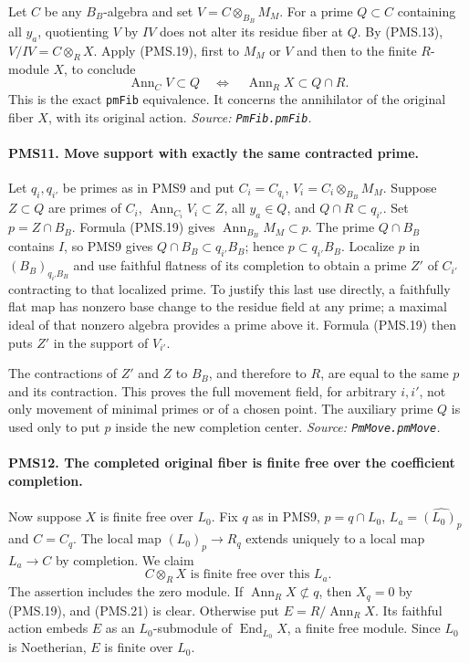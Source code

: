 Let $C$ be any $B_B$-algebra and set $V=C\otimes_{B_B}M_M$.
For a prime $Q\subset C$ containing all $y_a$, quotienting $V$
by $IV$ does not alter its residue fiber at $Q$.  By (PMS.13),
$V/IV=C\otimes_R X$.  Apply (PMS.19), first to $M_M$ or $V$
and then to the finite $R$-module $X$, to conclude
\[
 \operatorname{Ann}_{C}V\subset Q
 \quad\Longleftrightarrow\quad
 \operatorname{Ann}_{R}X\subset Q\cap R.          \tag{PMS.20}
\]
This is the exact \texttt{pmFib} equivalence.  It concerns the
annihilator of the original fiber $X$, with its original action.
\hfill\textit{Source: \texttt{PmFib.pmFib}.}

\paragraph{PMS11. Move support with exactly the same contracted prime.}
\label{claim:PMS11}
Let $q_i,q_{i'}$ be primes as in PMS9 and put
$C_i=C_{q_i}$, $V_i=C_i\otimes_{B_B}M_M$.
Suppose $Z\subset Q$ are primes of $C_i$,
$\operatorname{Ann}_{C_i}V_i\subset Z$, all $y_a\in Q$, and
$Q\cap R\subset q_{i'}$.
Set $p=Z\cap B_B$.  Formula (PMS.19) gives
$\operatorname{Ann}_{B_B}M_M\subset p$.
The prime $Q\cap B_B$ contains $I$, so PMS9 gives
$Q\cap B_B\subset q_{i'}B_B$; hence $p\subset q_{i'}B_B$.
Localize $p$ in $(B_B)_{q_{i'}B_B}$ and use faithful flatness of
its completion to obtain a prime $Z'$ of $C_{i'}$ contracting to
that localized prime.  To justify this last use directly, a
faithfully flat map has nonzero base change to the residue field
at any prime; a maximal ideal of that nonzero algebra provides
a prime above it.  Formula (PMS.19) then puts $Z'$ in the support
of $V_{i'}$.

The contractions of $Z'$ and $Z$ to $B_B$, and therefore to $R$,
are equal to the same $p$ and its contraction.  This proves the
full movement field, for arbitrary $i,i'$, not only movement of
minimal primes or of a chosen point.  The auxiliary prime $Q$
is used only to put $p$ inside the new completion center.
\hfill\textit{Source: \texttt{PmMove.pmMove}.}

\paragraph{PMS12. The completed original fiber is finite free over the coefficient completion.}
\label{claim:PMS12}
Now suppose $X$ is finite free over $L_0$.  Fix $q$ as in PMS9,
$p=q\cap L_0$, $L_a=\widehat{(L_0)_p}$ and $C=C_q$.
The local map $(L_0)_p\to R_q$ extends uniquely to a local map
$L_a\to C$ by completion.  We claim
\[
 C\otimes_R X\text{ is finite free over this }L_a.             \tag{PMS.21}
\]
The assertion includes the zero module.
If $\operatorname{Ann}_R X\not\subset q$, then $X_q=0$ by
(PMS.19), and (PMS.21) is clear.  Otherwise put
$E=R/\operatorname{Ann}_R X$.
Its faithful action embeds $E$ as an $L_0$-submodule of
$\operatorname{End}_{L_0}X$, a finite free module.  Since $L_0$
is Noetherian, $E$ is finite over $L_0$.

